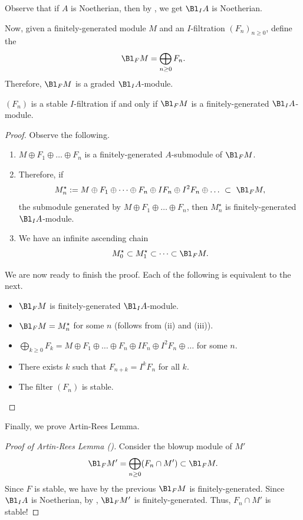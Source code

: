 Observe that if $A$ is Noetherian,
then by ,
we get $\Bl_I A$ is Noetherian.

Now, given a finitely-generated module $M$
and an $I$-filtration $(F_n)_{n\geq 0}$, define
the 
$$\Bl_F M = \bigoplus_{n\geq 0} F_n.$$
Therefore, $\Bl_F M$ is a graded $\Bl_I A$-module.
\begin{lemma}
    \label{lem:blowup_fin_gen}
    $(F_n)$ is a stable $I$-filtration
    if and only if $\Bl_F M$ is a finitely-generated $\Bl_I A$-module.
\end{lemma}
\begin{proof}
    Observe the following.
    \begin{enumerate}[label=(\roman*)]
    \item $M\oplus F_1\oplus\dots\oplus F_n$ is
     a finitely-generated $A$-submodule of $\Bl_F M$.
    \item Therefore, if
    $$M_n^\star := M\oplus F_1\oplus \dots\oplus F_n 
    \oplus IF_n \oplus I^2F_n \oplus\dots \ \subset\ 
    \Bl_F M,$$
    the submodule generated by $M\oplus F_1\oplus\dots\oplus F_n$,
    then $M_n^\star$ is finitely-generated $\Bl_I A$-module.
    \item We have an infinite ascending chain 
    $$M_0^\star \subset M_1^\star \subset \dots \subset 
    \Bl_F M.$$
    \end{enumerate}
    
    We are now ready to finish the proof.
    Each of the following is equivalent to the next.
    \begin{itemize}
    \item $ \Bl_F M$ is finitely-generated $\Bl_I A$-module.
    \item $ \Bl_F M = M_n^\star$ for some $n$
    (follows from (ii) and (iii)).
\item $\bigoplus_{k\geq 0} F_k = 
	M\oplus F_1\oplus\dots\oplus F_n\oplus IF_n\oplus I^2F_n
	\oplus\dots$
	for some $n$.
    \item There exists $k$ such that
	$F_{n+k} = I^kF_n$ for all $k$.
    \item The filter $(F_n)$ is stable. \qedhere
    \end{itemize}
\end{proof}
Finally, we prove Artin-Rees Lemma.
\begin{proof}[Proof of Artin-Rees Lemma ()]
   Consider the blowup module of $M'$
   $$ \Bl_F M' = \bigoplus_{n\geq 0} (F_n\cap M') \subset \Bl_F M.$$
   Since $F$ is stable, we have by the previous  
   $\Bl_F M$ is finitely-generated.
   Since $\Bl_I A$ is Noetherian, by , 
   $\Bl_F M'$ is finitely-generated.
   Thus, $F_n\cap M'$ is stable!
\end{proof}
%
%
%
